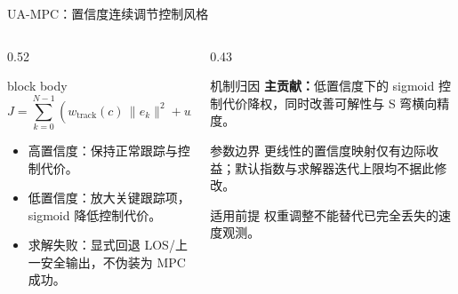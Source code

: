 \begin{frame}{UA-MPC：置信度连续调节控制风格}
  \small
  \begin{columns}[T,onlytextwidth]
    \begin{column}{0.52\textwidth}
      \begin{beamercolorbox}[rounded=true,sep=2mm]{block body}
        \[
          J =
          \sum_{k=0}^{N-1}
          \left(
            w_{\mathrm{track}}(c)\,\lVert e_k\rVert^2
            + w_{\mathrm{u}}(c)\,\lVert \Delta u_k\rVert^2
          \right)
        \]
      \end{beamercolorbox}
      \begin{itemize}
        \item 高置信度：保持正常跟踪与控制代价。
        \item 低置信度：放大关键跟踪项，sigmoid 降低控制代价。
        \item 求解失败：显式回退 LOS/上一安全输出，不伪装为 MPC 成功。
      \end{itemize}
    \end{column}
    \begin{column}{0.43\textwidth}
      \begin{block}{机制归因}
        \textbf{主贡献：}低置信度下的 sigmoid 控制代价降权，同时改善可解性与 S 弯横向精度。
      \end{block}
      \begin{block}{参数边界}
        更线性的置信度映射仅有边际收益；默认指数与求解器迭代上限均不据此修改。
      \end{block}
      \begin{alertblock}{适用前提}
        权重调整不能替代已完全丢失的速度观测。
      \end{alertblock}
    \end{column}
  \end{columns}
\end{frame}

